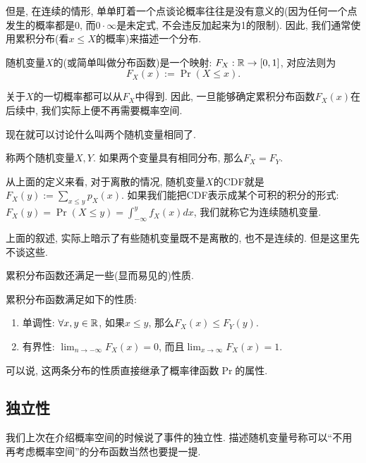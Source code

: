 \documentclass{ctexart}
\begin{document}
但是, 在连续的情形, 单单盯着一个点谈论概率往往是没有意义的(因为任何一个点发生的概率都是0, 而$0 \cdot \infty$是未定式, 不会违反加起来为1的限制). 因此, 我们通常使用累积分布(看$x\leq X$的概率)来描述一个分布.

\begin{definition}[累积分布函数]
    随机变量$X$的(或简单叫做分布函数)是一个映射: $F_X:\mathbb R \to [0, 1]$, 对应法则为
    \[
        F_X(x):=\Pr(X\leq x).
    \]
\end{definition}

关于$X$的一切概率都可以从$F_X$中得到. 因此, 一旦能够确定累积分布函数$F_X(x)$在后续中, 我们实际上便不再需要概率空间. 

现在就可以讨论什么叫两个随机变量相同了. 

\begin{definition}
    称两个随机变量$X, Y$. 如果两个变量具有相同分布, 那么$F_X = F_Y$.     
\end{definition}

从上面的定义来看, 对于离散的情况, 随机变量$X$的CDF就是$F_X(y):=\sum_{x\leq y}p_X(x)$. 如果我们能把CDF表示成某个可积的积分的形式: $F_X(y)=\operatorname{Pr}(X \leq y)=\int_{-\infty}^y f_X(x) d x$, 我们就称它为连续随机变量. 

上面的叙述, 实际上暗示了有些随机变量既不是离散的, 也不是连续的. 但是这里先不谈这些. 

累积分布函数还满足一些(显而易见的)性质. 

\begin{prop}[累积分布函数的性质]
    累积分布函数满足如下的性质: 
    \begin{enumerate}
        \item 单调性: $\forall x, y\in \mathbb R$, 如果$x\leq y$, 那么$F_X(x)\leq F_Y(y)$.
        \item 有界性: $\lim_{n \to -\infty} F_X(x)=0$, 而且$\lim_{x \to \infty} F_X(x)=1$. 
    \end{enumerate}
\end{prop}

可以说, 这两条分布的性质直接继承了概率律函数$\Pr$的属性. 

\subsection{独立性}

我们上次在介绍概率空间的时候说了事件的独立性. 描述随机变量号称可以``不用再考虑概率空间''的分布函数当然也要提一提. 
\end{document}
